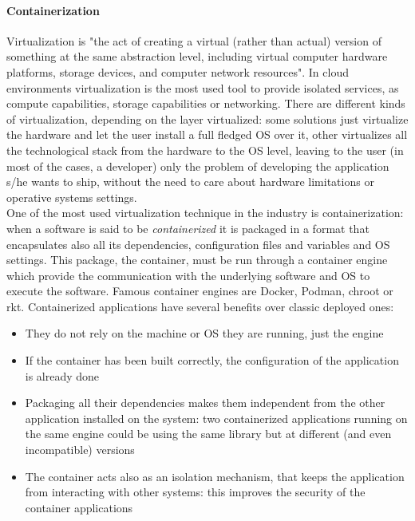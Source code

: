 \paragraph{Containerization}
  Virtualization is "the act of creating a virtual (rather than actual) version of something at the same abstraction level, including virtual computer hardware platforms, storage devices, and computer network resources"\cite{wiki:virtualization}. In cloud environments virtualization is the most used tool to provide isolated services, as compute capabilities, storage capabilities or networking. There are different kinds of virtualization, depending on the layer virtualized: some solutions just virtualize the hardware and let the user install a full fledged OS over it, other virtualizes all the technological stack from the hardware to the OS level, leaving to the user (in most of the cases, a developer) only the problem of developing the application s/he wants to ship, without the need to care about hardware limitations or operative systems settings.\\
  
  One of the most used virtualization technique in the industry is containerization: when a software is said to be \textit{containerized} it is packaged in a format that encapsulates also all its dependencies, configuration files and variables and OS settings. This package, the container, must be run through a container engine which provide the communication with the underlying software and OS to execute the software. Famous container engines are Docker, Podman, chroot or rkt. Containerized applications have several benefits over classic deployed ones:
  \begin{itemize}
    \item They do not rely on the machine or OS they are running, just the engine
    \item If the container has been built correctly, the configuration of the application is already done
    \item Packaging all their dependencies makes them independent from the other application installed on the system: two containerized applications running on the same engine could be using the same library but at different (and even incompatible) versions
    \item The container acts also as an isolation mechanism, that keeps the application from interacting with other systems: this improves the security of the container applications
  \end{itemize}
  
